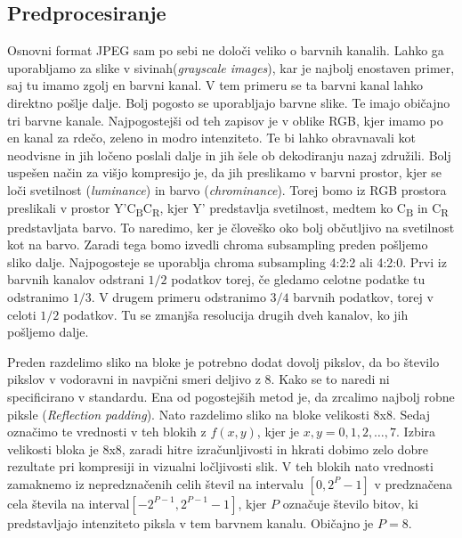 \documentclass[a4paper,12pt,openright]{book}
\begin{document}
\subsection{Predprocesiranje}
Osnovni format JPEG sam po sebi ne določi veliko o barvnih kanalih. Lahko ga uporabljamo za slike v sivinah(\textit{grayscale images}), kar je najbolj enostaven primer, saj tu imamo zgolj en barvni kanal. V tem primeru se ta barvni kanal lahko direktno pošlje dalje. Bolj pogosto se uporabljajo barvne slike. Te imajo običajno tri barvne kanale. Najpogostejši od teh zapisov je v oblike RGB, kjer imamo po en kanal za rdečo, zeleno in modro intenziteto. Te bi lahko obravnavali kot neodvisne in jih ločeno poslali dalje in jih šele ob dekodiranju nazaj združili. Bolj uspešen način za višjo kompresijo je, da jih preslikamo v barvni prostor, kjer se loči svetilnost (\textit{luminance}) in barvo (\textit{chrominance}). Torej bomo iz RGB prostora preslikali v prostor Y'C\textsubscript{B}C\textsubscript{R}, kjer Y' predstavlja svetilnost, medtem ko C\textsubscript{B} in C\textsubscript{R} predstavljata barvo. To naredimo, ker je človeško oko bolj občutljivo na svetilnost kot na barvo. Zaradi tega bomo izvedli chroma subsampling preden pošljemo sliko dalje. Najpogosteje se uporablja chroma subsampling 4:2:2 ali 4:2:0. Prvi iz barvnih kanalov odstrani \(1/2\) podatkov torej, če gledamo celotne podatke tu odstranimo \(1/3\). V drugem primeru odstranimo \(3/4\) barvnih podatkov, torej v celoti \(1/2\) podatkov. Tu se zmanjša resolucija drugih dveh kanalov, ko jih pošljemo dalje. \par

Preden razdelimo sliko na bloke je potrebno dodat dovolj pikslov, da bo število pikslov v vodoravni in navpični smeri deljivo z 8. Kako se to naredi ni specificirano v standardu. Ena od pogostejših metod je, da zrcalimo najbolj robne piksle (\textit{Reflection padding}). Nato razdelimo sliko na bloke velikosti 8x8. Sedaj označimo te vrednosti v teh blokih z \(f(x,y)\), kjer je \(x,y = 0,1,2,\ldots,7\). Izbira velikosti bloka je 8x8, zaradi hitre izračunljivosti in hkrati dobimo zelo dobre rezultate pri kompresiji in vizualni ločljivosti slik. V teh blokih nato vrednosti zamaknemo iz nepredznačenih celih števil na intervalu \(\left[0,2^P-1\right]\) v predznačena cela števila na interval\(\left[-2^{P-1},2^{P-1}-1\right]\), kjer \(P\) označuje število bitov, ki predstavljajo intenziteto piksla v tem barvnem kanalu. Običajno je \(P=8\).
\end{document}

